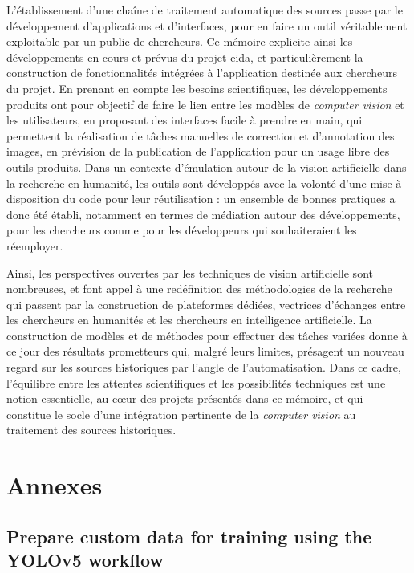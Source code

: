 \documentclass[a4paper,12pt,twoside]{book}
\newcommand{\cv}{\textit{computer vision}\xspace}
\newcommand{\eida}{\gls{eida}\xspace}
\newcommand{\ia}{intelligence artificielle\xspace}
\newcommand{\clearemptydoublepage}{\newpage{\pagestyle{empty}\cleardoublepage}}
\begin{document}
	L'établissement d'une chaîne de traitement automatique des sources passe par le développement d'applications et d'interfaces, pour en faire un outil véritablement exploitable par un public de chercheurs. Ce mémoire explicite ainsi les développements en cours et prévus du projet \eida, et particulièrement la construction de fonctionnalités intégrées à l'application destinée aux chercheurs du projet. En prenant en compte les besoins scientifiques, les développements produits ont pour objectif de faire le lien entre les modèles de \cv et les utilisateurs, en proposant des interfaces facile à prendre en main, qui permettent la réalisation de tâches manuelles de correction et d'annotation des images, en prévision de la publication de l'application pour un usage libre des outils produits. Dans un contexte d'émulation autour de la vision artificielle dans la recherche en humanité, les outils sont développés avec la volonté d'une mise à disposition du code pour leur réutilisation : un ensemble de bonnes pratiques a donc été établi, notamment en termes de médiation autour des développements, pour les chercheurs comme pour les développeurs qui souhaiteraient les réemployer.
	
	Ainsi, les perspectives ouvertes par les techniques de vision artificielle sont nombreuses, et font appel à une redéfinition des méthodologies de la recherche qui passent par la construction de plateformes dédiées, vectrices d'échanges entre les chercheurs en humanités et les chercheurs en \ia. La construction de modèles et de méthodes pour effectuer des tâches variées donne à ce jour des résultats prometteurs qui, malgré leurs limites, présagent un nouveau regard sur les sources historiques par l'angle de l'automatisation. Dans ce cadre, l'équilibre entre les attentes scientifiques et les possibilités techniques est une notion essentielle, au cœur des projets présentés dans ce mémoire, et qui constitue le socle d'une intégration pertinente de la \cv au traitement des sources historiques.
    \clearemptydoublepage
    
\appendix
    \part*{Annexes}	
    
    \chapter[Prepare custom data for training]{\label{YOLOv5Training}Prepare custom data for training using the YOLOv5 workflow}
	    
	    \clearemptydoublepage
\end{document}
